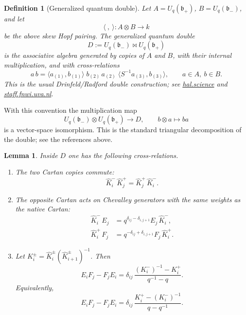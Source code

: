 \documentclass[11pt]{article}
\newcommand{\fb}{\mathfrak b}
\newcommand{\bipr}{\mathbin{\bowtie}}
\newcommand{\la}{\langle}
\newcommand{\ra}{\rangle}
\newcommand{\Khat}{\widehat K}
\newtheorem{lemma}[theorem]{Lemma}
\newtheorem{definition}[theorem]{Definition}
\begin{document}
\begin{definition}[Generalized quantum double]\label{def:double}
Let \(A=U_q(\fb_+)\), \(B=U_q(\fb_-)\), and let
\[
\la\ ,\ \ra:A\otimes B\to k
\]
be the above skew Hopf pairing.  The generalized quantum double
\[
D:=U_q(\fb_-)\bipr U_q(\fb_+)
\]
is the associative algebra generated by copies of \(A\) and \(B\), with their internal multiplication, and with cross-relations
\begin{equation}\label{eq:cross}
a\,b
=
\la a_{(1)},b_{(1)}\ra\;
b_{(2)}\,a_{(2)}\;
\la S^{-1}a_{(3)},b_{(3)}\ra,
\qquad a\in A,\ b\in B.
\end{equation}
This is the usual Drinfeld/Radford double construction; see
\href{https://hal.science/hal-02159493v1/file/CQG.pdf}{hal.science} and
\href{https://staff.fnwi.uva.nl/j.v.stokman/quantumdouble2.pdf}{staff.fnwi.uva.nl}.
\end{definition}

With this convention the multiplication map
\begin{equation}\label{eq:double-vector-space}
U_q(\fb_-)\otimes U_q(\fb_+)\longrightarrow D,\qquad
b\otimes a\longmapsto ba
\end{equation}
is a vector-space isomorphism.  This is the standard triangular decomposition of the double; see the references above.

\begin{lemma}\label{lem:double-relations}
Inside \(D\) one has the following cross-relations.
\begin{enumerate}[label=(\roman*)]
\item The two Cartan copies commute:
\[
\Khat_i^-\,\Khat_j^+=\Khat_j^+\,\Khat_i^- .
\]
\item The opposite Cartan acts on Chevalley generators with the same weights as the native Cartan:
\begin{align*}
\Khat_i^-\,E_j&=q^{\delta_{ij}-\delta_{i,j+1}}E_j\,\Khat_i^-,\\
\Khat_i^+\,F_j&=q^{-\delta_{ij}+\delta_{i,j+1}}F_j\,\Khat_i^+ .
\end{align*}
\item Let \(K_i^\pm=\Khat_i^\pm(\Khat_{i+1}^\pm)^{-1}\).  Then
\begin{equation}\label{eq:EF-double}
E_iF_j-F_jE_i
=
\delta_{ij}\,
\frac{(K_i^-)^{-1}-K_i^+}{q^{-1}-q}.
\end{equation}
Equivalently,
\[
E_iF_j-F_jE_i
=
\delta_{ij}\,
\frac{K_i^+-(K_i^-)^{-1}}{q-q^{-1}}.
\]
\end{enumerate}
\end{lemma}
\end{document}
